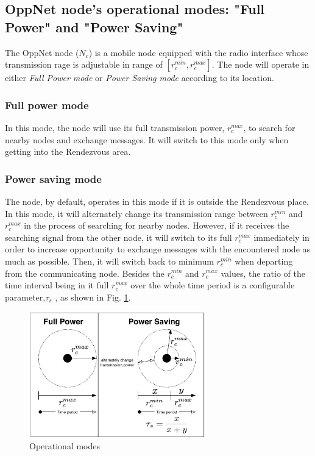 \documentclass[conference]{IEEEtran}
\begin{document}
\subsection{OppNet node's operational modes: "Full Power" and "Power Saving"}
The OppNet node ($N_{c}$) is a mobile node equipped with the radio interface whose transmission rage is adjustable in range of $[{ r }_{ c }^{ min },{ r }_{ c }^{ max }]$.
The node will operate in either \emph{Full Power mode} or \emph{Power Saving mode} according to its location.

\subsubsection{Full power mode}

In this mode, the node will use its full transmission power, ${ r }_{ c }^{ max }$, to search for nearby nodes and exchange messages.
It will switch to this mode only when getting into the Rendezvous area.

\subsubsection{Power saving mode}
The node, by default, operates in this mode if it is outside the Rendezvous place.
In this mode, it will alternately change its transmission range between ${ r }_{ c }^{ min }$ and ${ r }_{ c }^{ max }$ in the process of searching for nearby nodes.
However, if it receives the searching signal from the other node, it will switch to its full ${ r }_{ c }^{ max }$ immediately in order to increase opportunity to exchange messages with the encountered node as much as possible.
Then, it will switch back to minimum ${ r }_{ c }^{ min }$ when departing from the communicating node.
Besides the ${ r }_{ c }^{ min }$ and ${ r }_{ c }^{ max }$ values, the ratio of the time interval being in it full ${ r }_{ c }^{ max }$ over the whole time period is a configurable parameter,$\tau_{s}$ , as shown in Fig. \ref{Operational modes}.

\begin{figure}[!t]
	\centering
	\includegraphics[width=3in]{Figures/OperationalMode.pdf}
	\caption{Operational modes}
	\label{Operational modes}
\end{figure}
\end{document}
